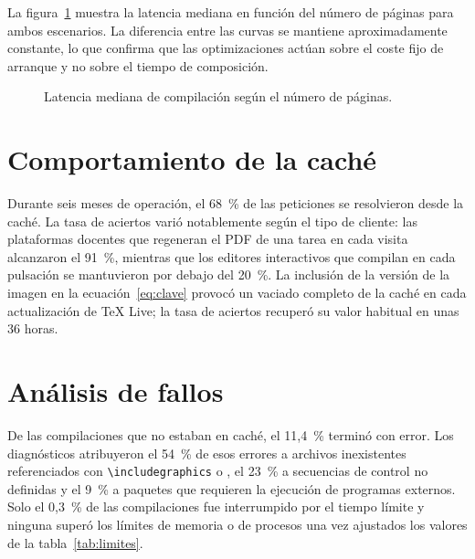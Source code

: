 La figura~\ref{fig:latencia} muestra la latencia mediana en función del
número de páginas para ambos escenarios. La diferencia entre las curvas se
mantiene aproximadamente constante, lo que confirma que las optimizaciones
actúan sobre el coste fijo de arranque y no sobre el tiempo de composición.

\begin{figure}[htbp]
  \centering
  \caption{Latencia mediana de compilación según el número de páginas.}
  \label{fig:latencia}
\end{figure}

\section{Comportamiento de la caché}
Durante seis meses de operación, el 68~\% de las peticiones se resolvieron
desde la caché. La tasa de aciertos varió notablemente según el tipo de
cliente: las plataformas docentes que regeneran el PDF de una tarea en cada
visita alcanzaron el 91~\%, mientras que los editores interactivos que
compilan en cada pulsación se mantuvieron por debajo del 20~\%. La inclusión
de la versión de la imagen en la ecuación~\eqref{eq:clave} provocó un vaciado
completo de la caché en cada actualización de \TeX{} Live; la tasa de
aciertos recuperó su valor habitual en unas 36 horas.

\section{Análisis de fallos}
De las compilaciones que no estaban en caché, el 11,4~\% terminó con error.
Los diagnósticos atribuyeron el 54~\% de esos errores a archivos
inexistentes referenciados con \verb|\includegraphics| o \verb||, el
23~\% a secuencias de control no definidas y el 9~\% a paquetes que requieren
la ejecución de programas externos. Solo el 0,3~\% de las compilaciones fue
interrumpido por el tiempo límite y ninguna superó los límites de memoria o
de procesos una vez ajustados los valores de la tabla~\ref{tab:limites}.

